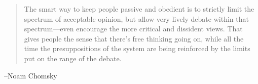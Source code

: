 \documentclass[letterpaper]{exam}
\begin{document}
  \else
    \vspace{7 cm}
    \begin{quote}
      \begin{em}
        The smart way to keep people passive and obedient is to strictly limit
        the spectrum of acceptable opinion, but allow very lively debate within
        that spectrum---even encourage the more critical and dissident views.
        That gives people the sense that there's free thinking going on, while
        all the time the presuppositions of the system are being reinforced by
        the limits put on the range of the debate.
      \end{em}
    \end{quote}
    \hspace{1 cm}--Noam Chomsky
  \fi
\end{document}
